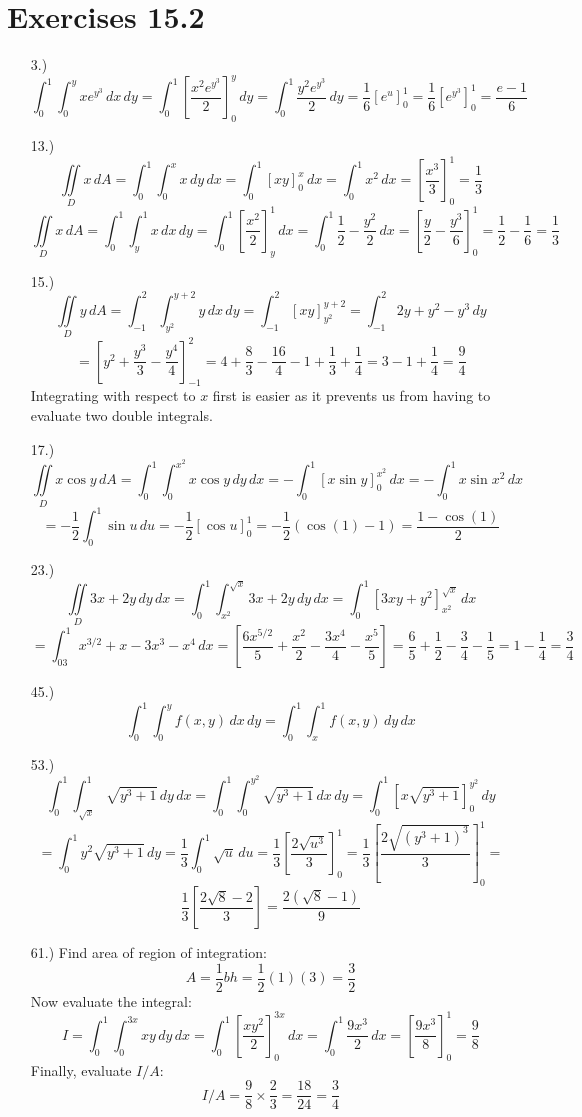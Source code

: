 \documentclass[12pt]{article}
\newcommand{\bracks}[1]{\left[#1\right]}
\newcommand{\parns}[1]{\left(#1\right)}
\begin{document}
\section*{Exercises 15.2}
\begin{itemize}
    \item [3.)] \[\int^1_0\int^y_0xe^{y^3}\,dx\,dy=\int^1_0\bracks{\frac{x^2e^{y^3}}{2}}^y_0\,dy=\int^1_0\frac{y^2e^{y^3}}{2}\,dy=\frac{1}{6}\bracks{e^u}^1_0=\frac{1}{6}\bracks{e^{y^3}}^1_0=\frac{e-1}{6}\]

    \item [13.)] \[\iint\limits_Dx\,dA=\int^1_0\int^x_0x\,dy\,dx=\int^1_0\bracks{xy}^x_0\,dx=\int^1_0x^2\,dx=\bracks{\frac{x^3}{3}}^1_0=\frac{1}{3}\]
    \[\iint\limits_Dx\,dA=\int^1_0\int^1_yx\,dx\,dy=\int^1_0\bracks{\frac{x^2}{2}}^1_y\,dx=\int^1_0\frac{1}{2}-\frac{y^2}{2}\,dx=\bracks{\frac{y}{2}-\frac{y^3}{6}}^1_0=\frac{1}{2}-\frac{1}{6}=\frac{1}{3}\]

    \item [15.)] \[\iint\limits_Dy\,dA=\int^2_{-1}\int_{y^2}^{y+2}y\,dx\,dy=\int^2_{-1}\bracks{xy}^{y+2}_{y^2}=\int^2_{-1}2y+y^2-y^3\,dy\]
    \[=\bracks{y^2+\frac{y^3}{3}-\frac{y^4}{4}}^2_{-1}=4+\frac{8}{3}-\frac{16}{4}-1+\frac{1}{3}+\frac{1}{4}=3-1+\frac{1}{4}=\frac{9}{4}\]
    Integrating with respect to $x$ first is easier as it prevents us from having to evaluate two double integrals.

    \item [17.)] \[\iint\limits_Dx\cos y\,dA=\int^1_0\int^{x^2}_0x\cos y\,dy\,dx=-\int^1_0\bracks{x\sin y}^{x^2}_0\,dx=-\int^1_0x\sin x^2\,dx\]
    \[=-\frac{1}{2}\int^1_0\sin u\,du=-\frac{1}{2}\bracks{\cos u}^1_0=-\frac{1}{2}(\cos(1)-1)=\frac{1-\cos(1)}{2}\]

    \item [23.)] \[\iint\limits_D3x+2y\,dy\,dx=\int^1_0\int^{\sqrt x}_{x^2}3x+2y\,dy\,dx=\int^1_0\bracks{3xy+y^2}^{\sqrt x}_{x^2}\,dx\]\[=\int^1_03x^{3/2}+x-3x^3-x^4\,dx=\bracks{\frac{6x^{5/2}}{5}+\frac{x^2}{2}-\frac{3x^4}{4}-\frac{x^5}{5}}=\frac{6}{5}+\frac{1}{2}-\frac{3}{4}-\frac{1}{5}=1-\frac{1}{4}=\frac{3}{4}\]

    \pagebreak
    \item [45.)] \[\int^1_0\int^y_0f(x,y)\,dx\,dy=\int^1_0\int^1_xf(x,y)\,dy\,dx\]

    \item [53.)] \[\int^1_0\int^1_{\sqrt x}\sqrt{y^3+1}\,dy\,dx=\int^1_0\int^{y^2}_0\sqrt{y^3+1}\,dx\,dy=\int^1_0\bracks{x\sqrt{y^3+1}}^{y^2}_0\,dy\]
    \[=\int^1_0y^2\sqrt{y^3+1}\,dy=\frac{1}{3}\int^1_0\sqrt{u}\,du=\frac{1}{3}\bracks{\frac{2\sqrt{u^3}}{3}}^1_0=\frac{1}{3}\bracks{\frac{2\sqrt{\parns{y^3+1}^3}}{3}}^1_0=\]
    \[\frac{1}{3}\bracks{\frac{2\sqrt8-2}{3}}=\frac{2\parns{\sqrt8-1}}{9}\]

    \item [61.)] Find area of region of integration:
    \[A=\frac{1}{2}bh=\frac{1}{2}(1)(3)=\frac{3}{2}\]
    Now evaluate the integral:
    \[I=\int^1_0\int^{3x}_0xy\,dy\,dx=\int^1_0\bracks{\frac{xy^2}{2}}^{3x}_0\,dx=\int^1_0\frac{9x^3}{2}\,dx=\bracks{\frac{9x^3}{8}}^1_0=\frac{9}{8}\]
    Finally, evaluate $I/A$:
    \[I/A=\frac{9}{8}\times\frac{2}{3}=\frac{18}{24}=\frac{3}{4}\]

\end{itemize}
\end{document}
